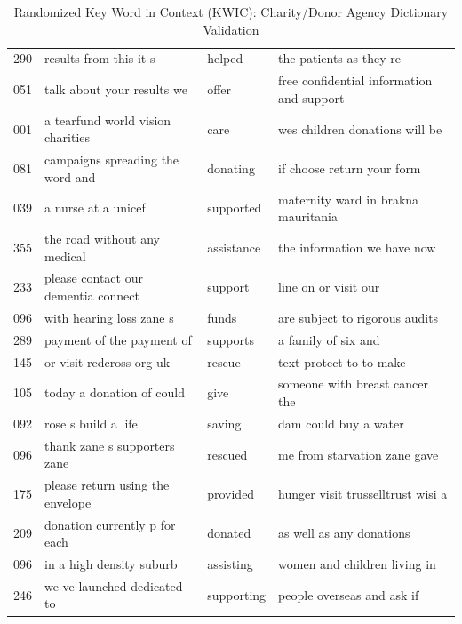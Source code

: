 \begin{table}[ht]
{\begin{tabular}{p{2.5cm}p{5cm}p{2.2cm}p{5cm}}
  290 & results from this it s & helped & the patients as they re \\ 
  051 & talk about your results we & offer & free confidential information and support \\ 
  001 & a tearfund world vision charities & care & wes children donations will be \\ 
  081 & campaigns spreading the word and & donating & if choose return your form \\ 
  039 & a nurse at a unicef & supported & maternity ward in brakna mauritania \\ 
  355 & the road without any medical & assistance & the information we have now \\ 
  233 & please contact our dementia connect & support & line on or visit our \\ 
  096 & with hearing loss zane s & funds & are subject to rigorous audits \\ 
  289 & payment of the payment of & supports & a family of six and \\ 
  145 & or visit redcross org uk & rescue & text protect to to make \\ 
  105 & today a donation of could & give & someone with breast cancer the \\ 
  092 & rose s build a life & saving & dam could buy a water \\ 
  096 & thank zane s supporters zane & rescued & me from starvation zane gave \\ 
  175 & please return using the envelope & provided & hunger visit trusselltrust wisi a \\ 
  209 & donation currently p for each & donated & as well as any donations \\ 
  096 & in a high density suburb & assisting & women and children living in \\ 
  246 & we ve launched dedicated to & supporting & people overseas and ask if \\ 
   \hline
\end{tabular}
}
\caption{Randomized Key Word in Context (KWIC): Charity/Donor Agency Dictionary Validation} 
\end{table}
